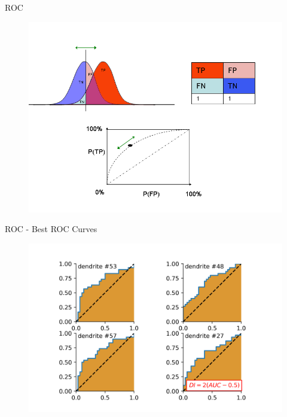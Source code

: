 \documentclass[10pt]{beamer}
\begin{document}
\begin{frame}[fragile]{ROC}
\begin{center}
	\begin{figure}
      \includegraphics[width=1.0\textwidth]{roc_exp.png}
	\end{figure}
	\end{center}
\end{frame}

\begin{frame}[fragile]{ROC - Best ROC Curves}
\begin{center}
	\begin{figure}
      \includegraphics[width=1.0\textwidth]{roc_four.png}
	\end{figure}
	\end{center}
\end{frame}
\end{document}
